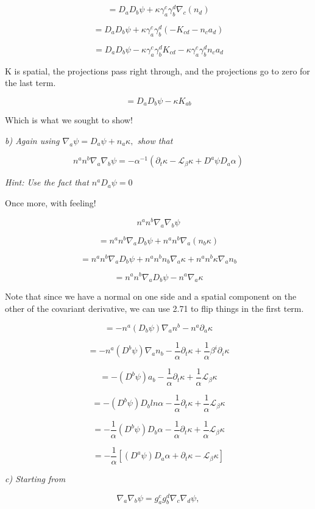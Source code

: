 \documentclass[landscape,letterpaper,10pt,english]{article}
\begin{document}
\[ = D_a D_b \psi + \kappa \gamma^c_a \gamma^d_b \nabla_c (n_d) \]

\[ = D_a D_b \psi + \kappa \gamma^c_a \gamma^d_b (-K_{cd} - n_c a_d) \]

\[ = D_a D_b \psi - \kappa\gamma^c_a \gamma^d_b K_{cd} - \kappa \gamma^c_a \gamma^d_b n_c a_d \]

K is spatial, the projections pass right through, and the projections go
to zero for the last term.

\[ = D_a D_b \psi - \kappa K_{ab}\]

Which is what we sought to show!

    \emph{b) Again using \(\nabla_a \psi = D_a \psi + n_a \kappa,\) show
that}

\[ n^an^b \nabla_a \nabla_b \psi = -\alpha^{-1} (\partial_t \kappa - \mathcal{L}_\beta \kappa + D^a \psi D_a \alpha) \]

\emph{Hint: Use the fact that \(n^a D_a \psi = 0\)}

    Once more, with feeling!

\[ n^an^b\nabla_a\nabla_b\psi \]

\[ = n^an^b\nabla_aD_b \psi + n^an^b\nabla_a(n_b \kappa) \]

\[ = n^an^b\nabla_aD_b \psi + n^an^bn_b\nabla_a \kappa + n^an^b\kappa\nabla_an_b \]

\[ = n^an^b\nabla_aD_b \psi - n^a \nabla_a \kappa \]

Note that since we have a normal on one side and a spatial component on
the other of the covariant derivative, we can use 2.71 to flip things in
the first term.

\[ = - n^a(D_b\psi)\nabla_a n^b - n^a \partial_a \kappa \]

\[ = - n^a(D^b\psi)\nabla_a n_b  - \frac1\alpha \partial_t \kappa + \frac1\alpha \beta^i \partial_i \kappa  \]

\[ = - (D^b\psi)a_b - \frac1\alpha \partial_t \kappa + \frac1\alpha \mathcal{L}_\beta \kappa  \]

\[ = - (D^b\psi)D_b ln\alpha - \frac1\alpha \partial_t \kappa + \frac1\alpha \mathcal{L}_\beta \kappa  \]

\[ = - \frac1\alpha (D^b\psi)D_b \alpha - \frac1\alpha \partial_t \kappa + \frac1\alpha \mathcal{L}_\beta \kappa  \]

\[ = - \frac1\alpha [(D^a\psi)D_a \alpha + \partial_t \kappa - \mathcal{L}_\beta \kappa]  \]

    \emph{c) Starting from}

\[ \nabla_a \nabla_b \psi = g^c_a g^d_b \nabla_c \nabla_d \psi, \]
\end{document}
